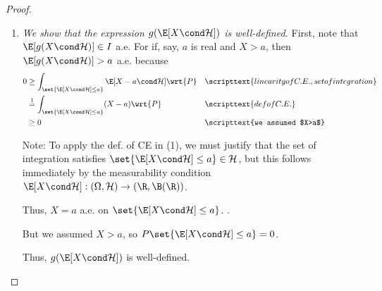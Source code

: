 \documentclass{article} %
\begin{document}
\begin{proof}

\begin{enumerate}
\item \textit{We show that the expression $g(\E[X \cond \mathcal{H}] )$ is well-defined.} First, note that  $\E[g(X \cond \mathcal{H})] \in I$ a.e. For if, say, $a$ is real and $X>a$, then $\E[g(X \cond \mathcal{H})] > a$ a.e. because
%
\begin{align*}
0 & \geq \int_{\set{\E[X \cond \mathcal{H}]  \leq a}} \E[X -a \cond \mathcal{H}] \wrt{P} && \scripttext{linearity of C.E., set of integration} \\
& \stackrel{1}{=} \int_{\set{\E[X \cond \mathcal{H}]  \leq a}} (X-a) \wrt{P} && \scripttext{def of C.E.} \\
& \geq 0 && \scripttext{we assumed $X>a$} 
\end{align*}

{\scriptsize Note: To apply the def. of CE  in (1), we must justify that the set of integration satisfies $\set{\E[X \cond \mathcal{H}]  \leq a} \in \mathcal{H}$, but this follows immediately by the measurability condition $\E[X \cond \mathcal{H}] : (\Omega, \mathcal{H}) \to (\R, \B(\R))$.}

Thus, $X=a$ a.e. on $\set{\E[X \cond \mathcal{H}]  \leq a}$. \quad {}.

But we assumed $X>a$, so $P\set{\E[X \cond \mathcal{H}]  \leq a} = 0$.  

Thus, $g(\E[X \cond \mathcal{H}] )$ is well-defined.


\end{enumerate}
\end{proof}
\end{document}
